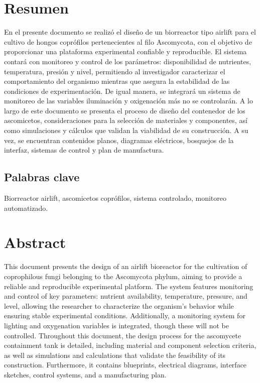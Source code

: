 \documentclass[11pt,tesis,twoside,openright,spanish]{upiiztt}
\begin{document}
\cleardoublepage
{
\section*{Resumen}\label{resumen}
\thispagestyle{empty}
\let\clearpage\relax

En el presente documento se realizó el diseño de un biorreactor tipo airlift para el
cultivo de hongos coprófilos pertenecientes al filo Ascomycota, con el objetivo de
proporcionar una plataforma experimental confiable y reproducible. El sistema
contará con monitoreo y control de los parámetros: disponibilidad de nutrientes,
temperatura, presión y nivel, permitiendo al investigador caracterizar el
comportamiento del organismo mientras que asegura la estabilidad de las
condiciones de experimentación. De igual manera, se integrará un sistema de
monitoreo de las variables iluminación y oxigenación más no se controlarán. A lo
largo de este documento se presenta el proceso de diseño del contenedor de los
ascomicetos, consideraciones para la selección de materiales y componentes, así
como simulaciones y cálculos que validan la viabilidad de su construcción. A su
vez, se encuentran contenidos planos, diagramas eléctricos, bosquejos de la
interfaz, sistemas de control y plan de manufactura.

\subsection*{Palabras clave}\label{palabras}

Biorreactor airlift, ascomicetos coprófilos, sistema controlado, monitoreo automatizado.

\newpage
\section*{Abstract}\label{abstract}

This document presents the design of an airlift bioreactor for the cultivation of
coprophilous fungi belonging to the Ascomycota phylum, aiming to provide a reliable
and reproducible experimental platform. The system features monitoring and control
of key parameters: nutrient availability, temperature, pressure, and level, allowing
the researcher to characterize the organism's behavior while ensuring stable
experimental conditions. Additionally, a monitoring system for lighting and
oxygenation variables is integrated, though these will not be controlled. Throughout
this document, the design process for the ascomycete containment tank is detailed,
including material and component selection criteria, as well as simulations and
calculations that validate the feasibility of its construction. Furthermore, it contains
blueprints, electrical diagrams, interface sketches, control systems, and a
manufacturing plan.

}
\end{document}
